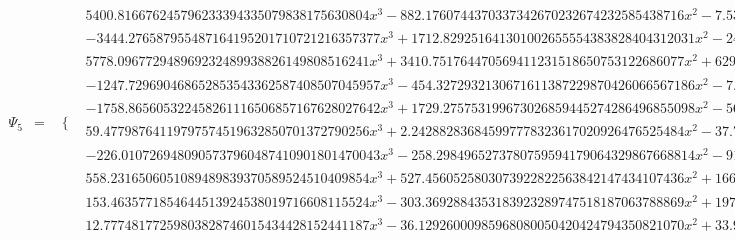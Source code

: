 \documentclass{article}
\begin{document}
\begin{landscape}
\begin{eqnarray*}
\begin{array}{cc}
\end{array}\\
\Psi_5 & = & \begin{array}{cc}
 \{ & 
\begin{array}{cc}
 5400.816676245796233394335079838175630804 x^3-882.1760744370337342670232674232585438716 x^2-7.530202490613631942172882760063335945267 x+2.106485345615195718491468110396577739311 & x\geq 0\land x<\frac{1}{8} \\
 -3444.276587955487164195201710721216357377 x^3+1712.829251641301002655554383828404312031 x^2-241.6677872507621569108077585155075504750 x+8.102298002302912711072615823081184908964 & x\geq \frac{1}{8}\land x<\frac{1}{4} \\
 5778.096772948969232489938826149808516241 x^3+3410.751764470569411231518650753122686077 x^2+629.4039464575944758675765229283229577757 x+35.05371099919693088820891005424267855566 & x\geq -\frac{1}{4}\land x<-\frac{1}{8} \\
 -1247.729690468652853543362587408507045957 x^3-454.3272932130671611387229870426066567186 x^2-7.530202490613631942172882760063335945267 x+2.106485345615195718491468110396577739311 & x\geq -\frac{1}{8}\land x<0 \\
 -1758.865605322458261116506857167628027642 x^3+1729.275753199673026859445274286496855098 x^2-565.9055972736410883400084887858516338338 x+61.79929755698331744502501065026160415486 & x\geq \frac{1}{4}\land x<\frac{3}{8} \\
 59.47798764119797574519632850701372790256 x^3+2.242882836845997778323617020926476525484 x^2-37.74464778306329145519827729316334052461 x+10.71372598259638521200003546141314232317 & x\geq \frac{3}{8}\land x<\frac{1}{2} \\
 -226.0107269480905737960487410901801470043 x^3-258.2984965273780759594179064329867668814 x^2-91.98285784857078295812848758417475406639 x-9.815156131403068239841246153579403171198 & x\geq -\frac{1}{2}\land x<-\frac{3}{8} \\
 558.2316506051089489839370589524510409854 x^3+527.4560525803073922822563842147434107436 x^2+166.4808009519372695503207210086378467192 x+17.96851407930118856344257362051139494903 & x\geq -\frac{3}{8}\land x<-\frac{1}{4} \\
 153.4635771854644513924538019716608115524 x^3-303.3692884353183923289747518187063788869 x^2+197.3783313309012419166569864479842021504 x-42.19291944937809340301018838233330061746 & x\geq \frac{1}{2}\land x<\frac{3}{4} \\
 12.77748177259803828746015434428152441187 x^3-36.12926000985968080050420424794350821070 x^2+33.92607470192524673862794546304244318578 x-10.57429646466360422558389555938045938695 & x\geq \frac{3}{4}\land x<1 \\

\end{array}
\end{array}
\end{eqnarray*}
\end{landscape}
\end{document}
